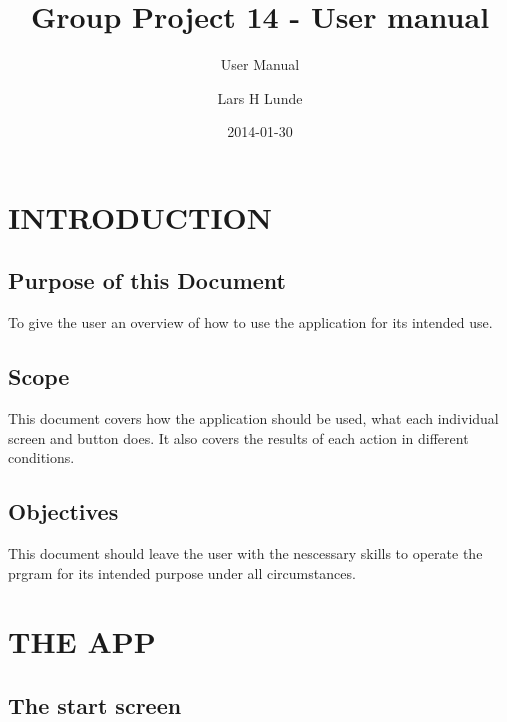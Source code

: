 \documentclass{project}
\begin{document}
\title{Group Project 14 - User manual}

\subtitle{User Manual}
\author{Lars H Lunde}     
\date{2014-01-30}

\maketitle
\tableofcontents
\newpage


\section{INTRODUCTION}

\subsection{Purpose of this Document}
To give the user an overview of how to use the application for its intended use.

\subsection{Scope}
This document covers how the application should be used, what each individual screen and button does. It also covers the results of each action in different conditions.

\subsection{Objectives}
This document should leave the user with the nescessary skills to operate the prgram for its intended purpose under all circumstances.

\clearpage

\section{THE APP}
\subsection{The start screen}
\end{document}
